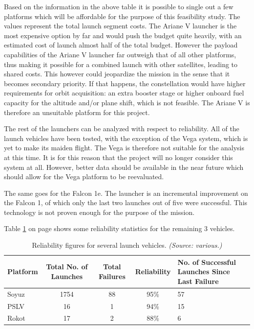 Based on the information  in the above table it is possible to single out a few platforms which will be affordable for the purpose of this feasibility study. The values represent the total launch segment costs. The Ariane V launcher is the most expensive option by far and would push the budget quite heavily, with an estimated cost of launch almost half of the total budget. However the payload capabilities of the Ariane V launcher far outweigh that of all other platforms, thus making it possible for a combined launch with other satellites, leading to shared costs. This however could jeopardize the mission in the sense that it becomes secondary priority. If that happens, the constellation would have higher requirements for orbit acquisition: an extra booster stage or higher onboard fuel capacity for the altitude and/or plane shift, which is not feasible. The Ariane V is therefore an unsuitable platform for this project. 

The rest of the launchers can be analyzed with respect to reliability. All of the launch vehicles have been tested, with the exception of the Vega system, which is yet to make its maiden flight. The Vega is therefore not suitable for the analysis at this time. It is for this reason that the project will no longer consider this system at all.  However, better data should be available in the near future which should allow for the Vega platform to be reevaluated.

The same goes for the Falcon 1e. The launcher is an incremental improvement on the Falcon 1, of which only the last two launches out of five were successful. This technology is not proven enough for the purpose of the mission.

Table \ref{table:LVreliability} on page \pageref{table:LVreliability} shows some reliability statistics for the remaining 3 vehicles.

\begin{table}[h]
\begin{centering}
\begin{tabular}{lcccp{5cm}}
\toprule
Platform & Total No. of Launches & Total Failures & Reliability & No. of Successful Launches Since Last Failure  \\
\hline \hline
Soyuz   & 1754  &  88 & 95\% & 57 \\
PSLV & 16 & 1 & 94\% & 15 \\
Rokot & 17& 2 & 88\% & 6 \\
\bottomrule
\end{tabular}
\caption{Reliability figures for several launch vehicles. \emph{(Source: various.)} }
\label{table:LVreliability}
\end{centering}
\end{table}

